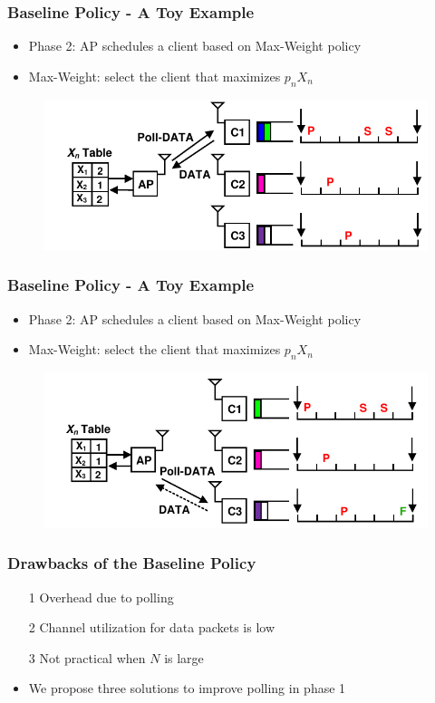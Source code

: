 \documentclass{beamer}
\begin{document}
\begin{frame}
\frametitle{Baseline Policy - A Toy Example}
\begin{itemize}
\item Phase 2: AP schedules a client based on Max-Weight policy
\item Max-Weight: select the client that maximizes $p_nX_n$
\end{itemize}
\begin{figure}
\centering
\includegraphics[scale=0.8]{animation_05.pdf}
\end{figure}
\end{frame}

\begin{frame}
\frametitle{Baseline Policy - A Toy Example}
\begin{itemize}
\item Phase 2: AP schedules a client based on Max-Weight policy
\item Max-Weight: select the client that maximizes $p_nX_n$
\end{itemize}
\begin{figure}
\centering
\includegraphics[scale=0.8]{animation_06.pdf}
\end{figure}
\end{frame}



\begin{frame}
\frametitle{Drawbacks of the Baseline Policy}
\begin{itemize}
\item [1] Overhead due to polling
\item [2] Channel utilization for data packets is low
\item [3] Not practical when $N$ is large
\item We propose three solutions to improve polling in phase 1
\end{itemize}
\end{frame}
\end{document}
